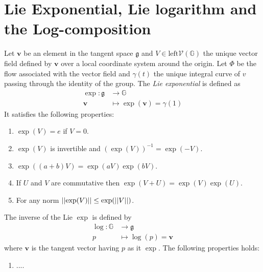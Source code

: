 \section{Lie Exponential, Lie logarithm and the Log-composition}
Let $\mathbf{v}$ be an element in the tangent space $\mathfrak{g}$ and $V\in\text{left}\mathcal{V}(\mathbb{G})$ the unique vector field defined by $\mathbf{v}$ over a local coordinate system around the origin. Let $\Phi$ be the flow associated with the vector field and $\gamma(t)$ the unique integral curve of $v$ passing through the identity of the group.  
The \emph{Lie exponential} is defined as
\begin{align*}
\exp :  \mathfrak{g} & \longrightarrow  \mathbb{G}  \\
\mathbf{v} &\longmapsto  \exp(\mathbf{v} ) = \gamma(1)
\end{align*}
It satisfies the following properties:
\begin{enumerate}

	 	\item $\exp(V) = e$ if $V = 0$.
	 	\item $\exp(V)$ is invertible and $(\exp(V))^{-1} = \exp(-V)$.
	 	\item $\exp((a+b)V) = \exp(aV)\exp(bV)$.
	 	\item If $U$ and $V$ are commutative then $\exp(V + U) = \exp(V)\exp(U)$.
	 	\item For any norm $\vert\lvert \exp(V) \rvert\vert \leq \exp(\vert\lvert V \rvert\vert)$.

\end{enumerate}
The inverse of the Lie $\exp$ is defined by
\begin{align*}
\log : \mathbb{G} & \longrightarrow \mathfrak{g} \\
p &\longmapsto \log (p)  =  \mathbf{v}   
\end{align*}
where $\mathbf{v}  $ is the tangent vector having $p$ as it $\exp$.
The following properties holds:
\begin{enumerate}
	\item ....
\end{enumerate} 


